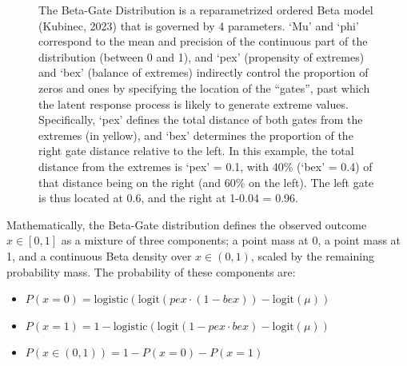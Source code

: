 \documentclass[
  jou,
  floatsintext,
  longtable,
  nolmodern,
  notxfonts,
  notimes,
  colorlinks=true,linkcolor=blue,citecolor=blue,urlcolor=blue]{apa7}
\providecommand{\tightlist}{%
  \setlength{\itemsep}{0pt}\setlength{\parskip}{0pt}}
\begin{document}
\begin{figure}

\caption{\label{fig-one}The Beta-Gate Distribution is a reparametrized
ordered Beta model (Kubinec, 2023) that is governed by 4 parameters.
`Mu' and `phi' correspond to the mean and precision of the continuous
part of the distribution (between 0 and 1), and `pex' (propensity of
extremes) and `bex' (balance of extremes) indirectly control the
proportion of zeros and ones by specifying the location of the
``gates'', past which the latent response process is likely to generate
extreme values. Specifically, `pex' defines the total distance of both
gates from the extremes (in yellow), and `bex' determines the proportion
of the right gate distance relative to the left. In this example, the
total distance from the extremes is `pex' = 0.1, with 40\% (`bex' = 0.4)
of that distance being on the right (and 60\% on the left). The left
gate is thus located at 0.6, and the right at 1-0.04 = 0.96.}


\end{figure}%

Mathematically, the Beta-Gate distribution defines the observed outcome
\(x \in [0, 1]\) as a mixture of three components; a point mass at 0, a
point mass at 1, and a continuous Beta density over \(x \in (0,1)\),
scaled by the remaining probability mass. The probability of these
components are:

\begin{itemize}
\tightlist
\item
  \(P(x = 0) = \text{logistic}\left( \text{logit}(pex \cdot (1 - bex)) - \text{logit}(\mu) \right)\)
\item
  \(P(x = 1) = 1 - \text{logistic}\left( \text{logit}(1 - pex \cdot bex) - \text{logit}(\mu) \right)\)
\item
  \(P(x \in (0,1)) = 1 - P(x = 0) - P(x = 1)\)
\end{itemize}
\end{document}
